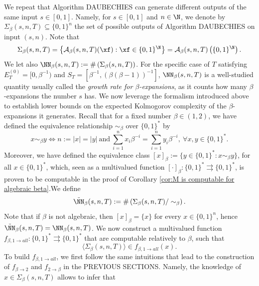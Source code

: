 We repeat that Algorithm DAUBECHIES can generate different outputs of the same input $s \in [0,1]$. Namely, for $s \in [0,1]$ and $n \in \N$, we denote by $\Sigma_\beta(s,n,T) \subseteq \{0,1\}^n$ the set of possible outputs of Algorithm DAUBECHIES on input $(s,n)$. Note that 
\begin{equation}
    \Sigma_\beta(s,n,T) = \left\{ \mathcal A_\beta(s,n,T)(\xf) : \xf \in \{0,1\}^\N\right\} = \mathcal A_\beta(s,n,T)\left( \{0,1\}^\N\right).
\end{equation} 
We let also $\NN_\beta(s,n,T) :=  \# \left(\Sigma_\beta(s,n,T) \right)$. For the specific case of $T$ satisfying $E_T^{(0)} = [0, \beta^{-1})$ and $S_T = [\beta^{-1}, (\beta(\beta-1))^{-1}]$, $\NN_\beta(s,n,T)$ is a well-studied quantity usually called the \textit{growth rate for $\beta$-expansions}, as it counts how many $\beta$-expansions the number $s$ has. We now leverage the formalism introduced above to establish lower bounds on the expected Kolmogorov complexity of the $\beta$-expansions it generates. Recall that for a fixed number $\beta \in (1,2)$, we have defined the equivalence relationship $\sim_\beta$ over $\{0,1\}^\ast$ by 
\begin{equation}
    x \sim_\beta y \iff n := |x| = |y| \ \text{and} \ \sum_{i=1}^n x_i \beta^{-i} = \sum_{i=1}^n y_i \beta^{-i}, \ \forall x,y \in \{0,1\}^\ast.
\end{equation}
Moreover, we have defined the equivalence class $[x]_\beta := \{y \in \{0,1\}^\ast : x \sim_\beta y\}$, for all $x \in \{0,1\}^\ast$, which, seen as a multivalued function $[\cdot]_\beta : \{0,1\}^\ast \rightrightarrows \{0,1\}^\ast$, is proven to be computable in the proof of Corollary \ref{cor:M is computable for algebraic beta}.We define 
\begin{equation}
    \tilde\NN_\beta(s,n,T) := \# \left(\Sigma_\beta(s,n,T) / \sim_\beta\right).
\end{equation}
Note that if $\beta$ is not algebraic, then $[x]_\beta = \{x\}$ for every $x \in \{0,1\}^n$, hence $\tilde\NN_\beta(s,n,T) = \NN_\beta(s,n,T)$. We now construct a multivalued function $f_{\beta, 1 \to all} : \{0,1\}^\ast \rightrightarrows \{0,1\}^\ast$ that are computable relatively to $\beta$, such that
\begin{equation}
    \langle \Sigma_\beta(s,n,T) \rangle \in f_{\beta, 1 \to all}\left(x\right). 
\end{equation}
To build $f_{\beta, 1 \to all}$, we first follow the same intuitions that lead to the construction of $f_{\beta \to 2}$ and $f_{2 \to \beta}$ in the PREVIOUS SECTIONS. Namely, the knowledge of $x \in \Sigma_\beta(s,n,T)$ allows to infer that
